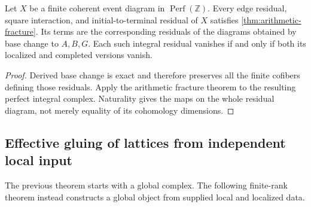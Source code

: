 \begin{corollary}\label{cor:residual-fracture}
Let $X$ be a finite coherent event diagram in $\operatorname{Perf}(\mathbb Z)$. Every edge residual, square interaction, and initial-to-terminal residual of $X$ satisfies \cref{thm:arithmetic-fracture}. Its terms are the corresponding residuals of the diagrams obtained by base change to $A,B,G$. Each such integral residual vanishes if and only if both its localized and completed versions vanish.
\end{corollary}
\begin{proof}
Derived base change is exact and therefore preserves all the finite cofibers defining those residuals. Apply the arithmetic fracture theorem to the resulting perfect integral complex. Naturality gives the maps on the whole residual diagram, not merely equality of its cohomology dimensions.
\end{proof}

\subsection{Effective gluing of lattices from independent local input}

The previous theorem starts with a global complex. The following finite-rank theorem instead constructs a global object from supplied local and localized data.

